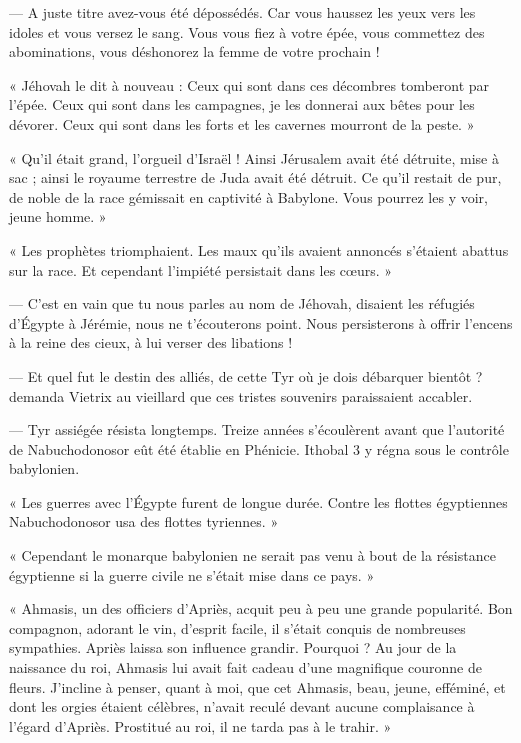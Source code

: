 \documentclass[a4paper, 11pt, oneside, polutonikogreek, french]{article}
\begin{document}
--- A juste titre avez-vous été dépossédés. Car vous haussez les yeux vers les idoles et vous versez le sang. Vous vous fiez à votre épée, vous commettez des abominations, vous déshonorez la femme de votre prochain !

« Jéhovah le dit à nouveau : Ceux qui sont dans ces décombres tomberont par l'épée. Ceux qui sont dans les campagnes, je les donnerai aux bêtes pour les dévorer. Ceux qui sont dans les forts et les cavernes mourront de la peste. »

« Qu'il était grand, l'orgueil d'Israël ! Ainsi Jérusalem avait été détruite, mise à sac ; ainsi le royaume terrestre de Juda avait été détruit. Ce qu'il restait de pur, de noble de la race gémissait en captivité à Babylone. Vous pourrez les y voir, jeune homme. »

« Les prophètes triomphaient. Les maux qu'ils avaient annoncés s'étaient abattus sur la race. Et cependant l'impiété persistait dans les cœurs. »

--- C'est en vain que tu nous parles au nom de Jéhovah, disaient les réfugiés d'Égypte à Jérémie, nous ne t'écouterons point. Nous persisterons à offrir l'encens à la reine des cieux, à lui verser des libations !

\bigskip
\centerline{\EightStarTaper}
\centerline{\EightStarTaper\EightStarTaper}
\bigskip

--- Et quel fut le destin des alliés, de cette Tyr où je dois débarquer bientôt ? demanda Vietrix au vieillard que ces tristes souvenirs paraissaient accabler.

--- Tyr assiégée résista longtemps. Treize années s'écoulèrent avant que l'autorité de Nabuchodonosor eût été établie en Phénicie. Ithobal 3 y régna sous le contrôle babylonien.

« Les guerres avec l'Égypte furent de longue durée. Contre les flottes égyptiennes Nabuchodonosor usa des flottes tyriennes. »

« Cependant le monarque babylonien ne serait pas venu à bout de la résistance égyptienne si la guerre civile ne s'était mise dans ce pays. »

« Ahmasis, un des officiers d'Apriès, acquit peu à peu une grande popularité. Bon compagnon, adorant le vin, d'esprit facile, il s'était conquis de nombreuses sympathies. Apriès laissa son influence grandir. Pourquoi ? Au jour de la naissance du roi, Ahmasis lui avait fait cadeau d'une magnifique couronne de fleurs. J'incline à penser, quant à moi, que cet Ahmasis, beau, jeune, efféminé, et dont les orgies étaient célèbres, n'avait reculé devant aucune complaisance à l'égard d'Apriès. Prostitué au roi, il ne tarda pas à le trahir. »
\end{document}
